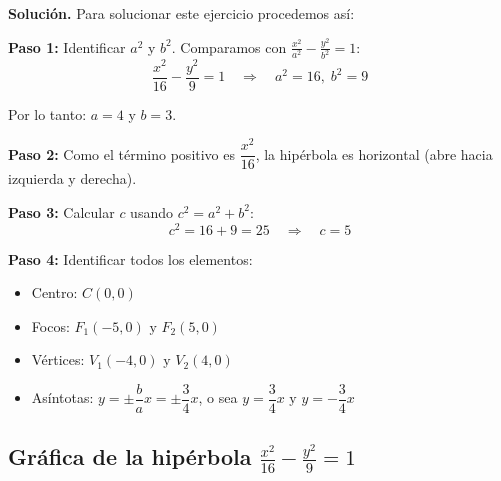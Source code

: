 \documentclass[12pt,a4paper]{article}
\begin{document}
	\bigskip

	\textbf{Solución.} Para solucionar este ejercicio procedemos así:

	\bigskip

	\textbf{Paso 1:} Identificar $a^2$ y $b^2$. Comparamos con $\displaystyle\frac{x^2}{a^2}-\frac{y^2}{b^2}=1$:
	\[
	\frac{x^2}{16}-\frac{y^2}{9}=1 \quad\Rightarrow\quad a^2=16,\;b^2=9
	\]

	Por lo tanto: $a=4$ y $b=3$.

	\textbf{Paso 2:} Como el término positivo es $\dfrac{x^2}{16}$, la hipérbola es horizontal (abre hacia izquierda y derecha).

	\textbf{Paso 3:} Calcular $c$ usando $c^2=a^2+b^2$:
	\[
	c^2=16+9=25 \quad\Rightarrow\quad c=5
	\]

	\textbf{Paso 4:} Identificar todos los elementos:
	\begin{itemize}
		\item Centro: $\boxed{C(0,0)}$
		\item Focos: $\boxed{F_1(-5,0)\text{ y }F_2(5,0)}$
		\item Vértices: $\boxed{V_1(-4,0)\text{ y }V_2(4,0)}$
		\item Asíntotas: $y=\pm\dfrac{b}{a}x=\pm\dfrac{3}{4}x$, o sea $\boxed{y=\dfrac{3}{4}x\text{ y }y=-\dfrac{3}{4}x}$
	\end{itemize}

	\subsection*{Gráfica de la hipérbola $\displaystyle\frac{x^2}{16}-\frac{y^2}{9}=1$}
\end{document}

